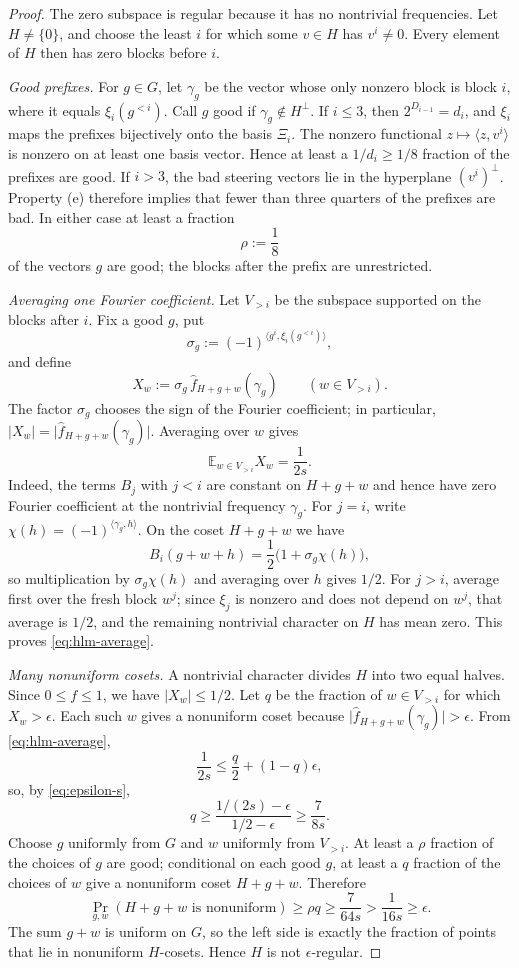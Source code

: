 \documentclass[10pt,a4paper]{amsart}
\numberwithin{theorem}{section}
\newcommand{\inner}[2]{\langle #1,#2\rangle}
\newcommand{\abs}[1]{\lvert #1\rvert}
\newcommand{\Xii}{\Xi}
\begin{document}
\begin{proof}
The zero subspace is regular because it has no nontrivial frequencies.  Let
$H\ne\{0\}$, and choose the least $i$ for which some $v\in H$ has
$v^i\ne0$.  Every element of $H$ then has zero blocks before $i$.

\smallskip\noindent\emph{Good prefixes.}
For $g\in G$, let $\gamma_g$ be the vector whose only nonzero block is block
$i$, where it equals $\xi_i(g^{<i})$. Call $g$ good if
$\gamma_g\notin H^\perp$. If $i\le3$, then $2^{D_{i-1}}=d_i$, and $\xi_i$ maps the prefixes
bijectively onto the basis $\Xii_i$.  The nonzero functional
$z\mapsto\inner{z}{v^i}$ is nonzero on at least one basis vector.  Hence at
least a $1/d_i\ge1/8$ fraction of the prefixes are good.  If $i>3$, the bad
steering vectors lie in the hyperplane
$(v^i)^\perp$. Property (e) therefore implies that fewer than three quarters
of the prefixes are bad. In either case at least a fraction
\[
  \rho:=\frac18
\]
of the vectors $g$ are good; the blocks after the prefix are unrestricted.

\smallskip\noindent\emph{Averaging one Fourier coefficient.}
Let $V_{>i}$ be the subspace supported on the blocks after $i$.  Fix a good
$g$, put
\[
  \sigma_g:=(-1)^{\inner{g^i}{\xi_i(g^{<i})}},
\]
and define
\[
  X_w:=\sigma_g\,\widehat f_{H+g+w}(\gamma_g)\qquad(w\in V_{>i}).
\]
The factor $\sigma_g$ chooses the sign of the Fourier coefficient; in
particular, $\abs{X_w}=\abs{\widehat f_{H+g+w}(\gamma_g)}$. Averaging over $w$
gives
\begin{equation}\label{eq:hlm-average}
  \mathbb E_{w\in V_{>i}}X_w=\frac1{2s}.
\end{equation}
Indeed, the terms $B_j$ with $j<i$ are constant on $H+g+w$ and hence have
zero Fourier coefficient at the nontrivial frequency $\gamma_g$. For $j=i$,
write $\chi(h)=(-1)^{\inner{\gamma_g}{h}}$. On the coset $H+g+w$ we have
\[
  B_i(g+w+h)=\frac12\bigl(1+\sigma_g\chi(h)\bigr),
\]
so multiplication by $\sigma_g\chi(h)$ and averaging over $h$ gives $1/2$.
For $j>i$, average first over the fresh block $w^j$; since $\xi_j$ is nonzero
and does not depend on $w^j$, that average is $1/2$, and the remaining
nontrivial character on $H$ has mean zero. This proves
\eqref{eq:hlm-average}.

\smallskip\noindent\emph{Many nonuniform cosets.}
A nontrivial character divides $H$ into two equal halves.  Since $0\le f\le1$,
we have $\abs{X_w}\le1/2$.  Let $q$ be the fraction of $w\in V_{>i}$ for
which $X_w>\epsilon$. Each such $w$ gives a nonuniform coset because
$\abs{\widehat f_{H+g+w}(\gamma_g)}>\epsilon$. From
\eqref{eq:hlm-average},
\[
  \frac1{2s}\le \frac q2+(1-q)\epsilon,
\]
so, by \eqref{eq:epsilon-s},
\[
  q\ge\frac{1/(2s)-\epsilon}{1/2-\epsilon}
  \ge\frac7{8s}.
\]
Choose $g$ uniformly from $G$ and $w$ uniformly from $V_{>i}$.  At least a
$\rho$ fraction of the choices of $g$ are good; conditional on each good
$g$, at least a $q$ fraction of the choices of $w$ give a nonuniform coset
$H+g+w$.  Therefore
\[
  \Pr_{g,w}(H+g+w\text{ is nonuniform})
  \ge\rho q\ge\frac7{64s}>\frac1{16s}\ge\epsilon.
\]
The sum $g+w$ is uniform on $G$, so the left side is exactly the fraction of
points that lie in nonuniform $H$-cosets.  Hence $H$ is not
$\epsilon$-regular.


\end{proof}
\end{document}
